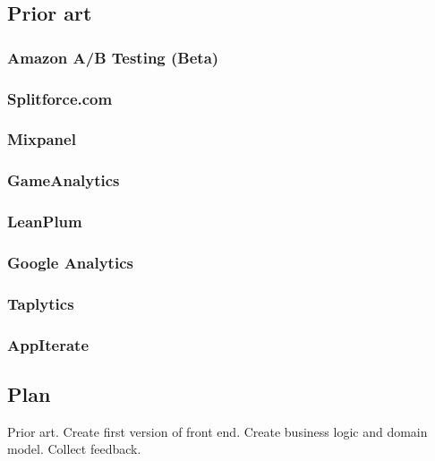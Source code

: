 \documentclass[english,12pt,a4paper,pdftex,elec,utf8]{aaltothesis}
\begin{document}
\subsection{Prior art}
\subsubsection{Amazon A/B Testing (Beta)}
\subsubsection{Splitforce.com}
\subsubsection{Mixpanel}
\subsubsection{GameAnalytics}
\subsubsection{LeanPlum}
\subsubsection{Google Analytics}
\subsubsection{Taplytics}
\subsubsection{AppIterate}

\subsection{Plan}
Prior art. Create first version of front end. Create business logic and domain model. Collect feedback.




\end{document}
